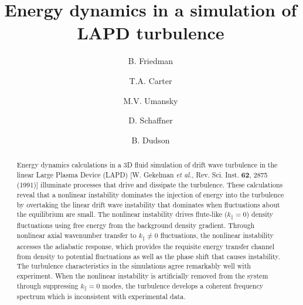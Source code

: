 \documentclass[showpacs,preprintnumbers,amsmath,amssymb,superscriptaddress]{revtex4}
\begin{document}
\title{Energy dynamics in a simulation of LAPD turbulence}

\author{B. Friedman}

\author{T.A. Carter}


\author{M.V. Umansky}

\author{D. Schaffner}


\author{B. Dudson}





\begin{abstract}
Energy dynamics calculations in a 3D fluid simulation of drift wave turbulence in the linear Large Plasma Device (LAPD) [W. Gekelman \emph{et al.}, Rev. Sci. Inst. {\bf 62}, 2875 (1991)]
illuminate processes that drive and dissipate the turbulence.
These calculations reveal that a nonlinear instability dominates the injection of energy into the turbulence by overtaking the linear drift
wave instability that dominates when fluctuations about the equilibrium are small.
The nonlinear instability drives flute-like ($k_\parallel = 0$) density fluctuations using free energy from the background density gradient. 
Through nonlinear axial wavenumber transfer to $k_\parallel \ne 0$ fluctuations, the nonlinear instability accesses the adiabatic response, 
which provides the requisite energy transfer channel from density to potential fluctuations as well as the
phase shift that causes instability. The turbulence characteristics in the simulations agree remarkably well with experiment. When the nonlinear instability is artificially 
removed from the system through suppressing $k_\parallel=0$ modes, the turbulence develops a coherent frequency spectrum which is inconsistent
with experimental data. 
\end{abstract}

\maketitle
\end{document}
